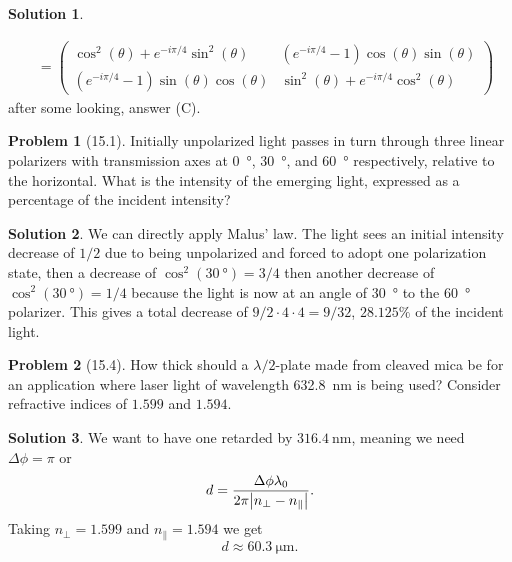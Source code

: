 \documentclass[10pt]{article}
\theoremstyle{definition}
\newtheorem{problem}{Problem}
\newtheorem{soln}{Solution}
\begin{document}
\begin{soln}
\begin{enumerate}[label=(\roman*)]
\begin{align*}
                                                & =\begin{pmatrix}
                                                     \cos^2(\theta)+e^{-i\pi /4}\sin^2 (\theta) &
                                                     (e^{-i\pi /4}-1)\cos (\theta)\sin (\theta)   \\
                                                     (e^{-i\pi /4}-1)\sin (\theta)\cos (\theta) &
                                                     \sin^2(\theta)+e^{-i\pi /4}\cos^2 (\theta)
                                                   \end{pmatrix}
          \end{align*}
          after some looking, answer (C).
  \end{enumerate}
\end{soln}

\begin{problem}[15.1]
Initially unpolarized light passes in turn through three linear polarizers with transmission axes at \qty{0}{\degree},
\qty{30}{\degree}, and \qty{60}{\degree} respectively, relative to the horizontal. What is the intensity of the emerging light, expressed
as a percentage of the incident intensity?
\end{problem}
\begin{soln}
  We can directly apply Malus' law. The light sees an initial intensity decrease of $1/2$ due to being unpolarized and forced to adopt one
  polarization state, then a decrease of $\cos^2(\qty{30}{\degree})=3/4$ then another decrease of $\cos^2(\qty{30}{\degree})=1/4$ because
  the light is now at an angle of \qty{30}{\degree} to the \qty{60}{\degree} polarizer. This gives a total decrease of
  $9/2\cdot 4\cdot 4=9/32$, $28.125\%$ of the incident light.
\end{soln}

\begin{problem}[15.4]
How thick should a $\lambda/2$-plate made from cleaved mica be for an application where laser light of wavelength
\qty{632.8}{\nano\meter} is being used? Consider refractive indices of $1.599$ and $1.594$.
\end{problem}
\begin{soln}
  We want to have one retarded by $\qty{316.4}{\nano\meter}$, meaning we need $\Delta \phi =\pi$ or
  $$d=\frac{\Delta \phi \lambda_0}{2\pi\abs{n_\perp-n_\parallel}}.$$
  Taking $n_\perp=1.599$ and $n_\parallel=1.594$ we get
  $$d\approx \qty{60.3}{\micro\meter}.$$
\end{soln}
\newpage
\end{document}
